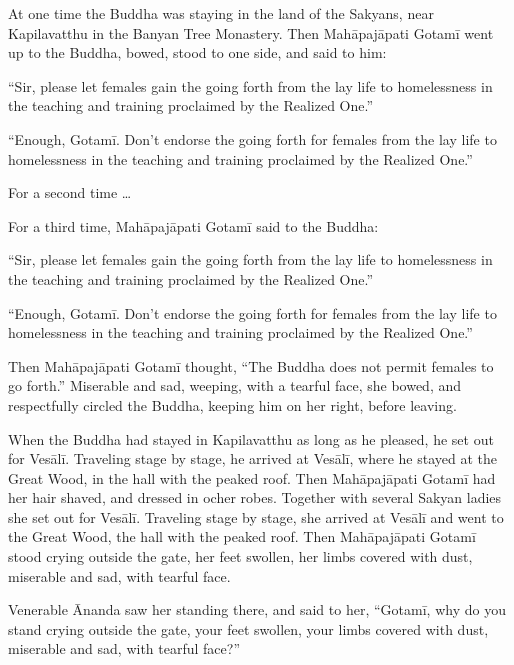 \documentclass[12pt,openany]{book}%
\begin{document}
At one time the Buddha was staying in the land of the Sakyans, near Kapilavatthu in the Banyan Tree Monastery. Then \textsanskrit{Mahāpajāpati} \textsanskrit{Gotamī} went up to the Buddha, bowed, stood to one side, and said to him: 

“Sir, please let females gain the going forth from the lay life to homelessness in the teaching and training proclaimed by the Realized One.” 

“Enough, \textsanskrit{Gotamī}. Don’t endorse the going forth for females from the lay life to homelessness in the teaching and training proclaimed by the Realized One.” 

For a second time … 

For a third time, \textsanskrit{Mahāpajāpati} \textsanskrit{Gotamī} said to the Buddha: 

“Sir, please let females gain the going forth from the lay life to homelessness in the teaching and training proclaimed by the Realized One.” 

“Enough, \textsanskrit{Gotamī}. Don’t endorse the going forth for females from the lay life to homelessness in the teaching and training proclaimed by the Realized One.” 

Then \textsanskrit{Mahāpajāpati} \textsanskrit{Gotamī} thought, “The Buddha does not permit females to go forth.” Miserable and sad, weeping, with a tearful face, she bowed, and respectfully circled the Buddha, keeping him on her right, before leaving. 

When the Buddha had stayed in Kapilavatthu as long as he pleased, he set out for \textsanskrit{Vesālī}. Traveling stage by stage, he arrived at \textsanskrit{Vesālī}, where he stayed at the Great Wood, in the hall with the peaked roof. Then \textsanskrit{Mahāpajāpati} \textsanskrit{Gotamī} had her hair shaved, and dressed in ocher robes. Together with several Sakyan ladies she set out for \textsanskrit{Vesālī}. Traveling stage by stage, she arrived at \textsanskrit{Vesālī} and went to the Great Wood, the hall with the peaked roof. Then \textsanskrit{Mahāpajāpati} \textsanskrit{Gotamī} stood crying outside the gate, her feet swollen, her limbs covered with dust, miserable and sad, with tearful face. 

Venerable Ānanda saw her standing there, and said to her, “\textsanskrit{Gotamī}, why do you stand crying outside the gate, your feet swollen, your limbs covered with dust, miserable and sad, with tearful face?” 
\end{document}
